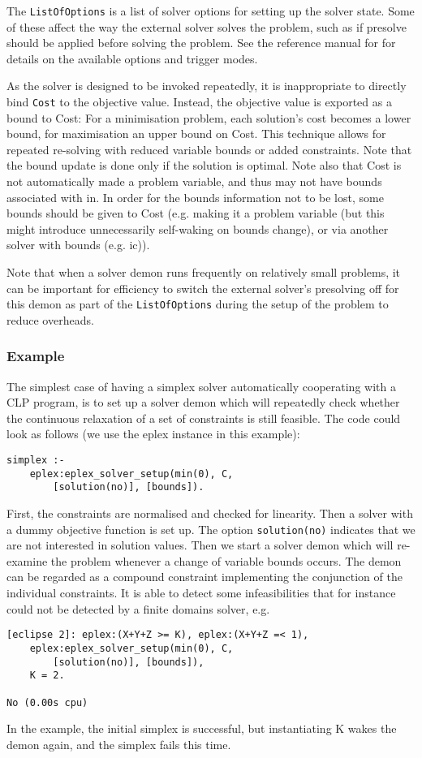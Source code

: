 The {\tt ListOfOptions} is a list of solver options for setting up the
solver state. Some of these affect the way the external solver solves the
problem, such as if presolve should be applied before solving the problem.
See the reference manual for  for
details on the available options and trigger modes.

As the solver is designed to be invoked repeatedly, it is inappropriate to
directly bind {\tt Cost} to the objective value. Instead, the objective
value is exported as a bound to Cost:
For a minimisation problem, each solution's
cost becomes a lower bound, for maximisation an upper bound on Cost.
This technique allows for repeated re-solving with reduced variable bounds
or added constraints. Note that the bound update is done only if the
solution is optimal. Note also that Cost is not automatically 
made a problem variable, and thus may not have bounds associated
with in. In order for the bounds information not to be lost, some bounds
should be given to Cost (e.g. making it a problem variable (but
this might introduce unnecessarily self-waking on bounds change), or via
another solver with bounds (e.g. ic)). 


Note that when a solver demon runs frequently on relatively small problems,
it can be important for efficiency to switch the external solver's
presolving off for this demon as part of the {\tt ListOfOptions} during the
setup of the problem to reduce overheads.

\subsubsection{Example}

The simplest case of having a simplex solver automatically cooperating
with a CLP program, is to set up a solver demon which will repeatedly
check whether the continuous relaxation of a set of constraints
is still feasible.
The code could look as follows (we use the eplex instance in this example):
\begin{verbatim}
simplex :-
    eplex:eplex_solver_setup(min(0), C, 
        [solution(no)], [bounds]).
\end{verbatim}
First, the constraints are normalised and checked for linearity.
Then a solver with a dummy objective function is set up. The option
{\tt solution(no)} indicates that we are not interested in solution values.
Then we start a solver demon which will re-examine the problem
whenever a change of variable bounds occurs.
The demon can be regarded as a compound constraint implementing the
conjunction of the individual constraints. It is able to detect
some infeasibilities that for instance could not be detected by a
finite domains solver, e.g.
\begin{verbatim}
[eclipse 2]: eplex:(X+Y+Z >= K), eplex:(X+Y+Z =< 1),
    eplex:eplex_solver_setup(min(0), C, 
        [solution(no)], [bounds]),
    K = 2.

No (0.00s cpu)
\end{verbatim}
In the example, the initial simplex is successful, but instantiating
K wakes the demon again, and the simplex fails this time.

